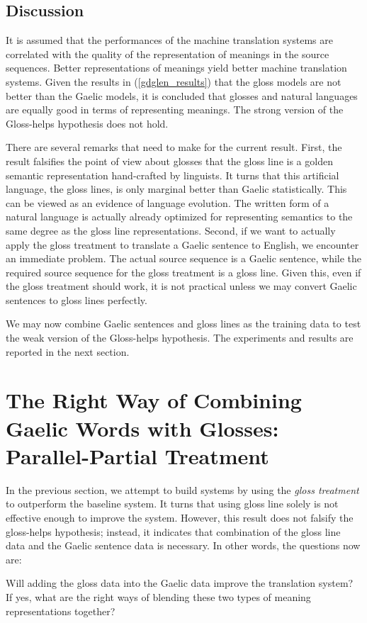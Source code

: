 \documentclass[11pt,a4paper]{article}
\begin{document}
\subsection{Discussion}
It is assumed that the performances of the machine translation systems are correlated with the quality of the representation of meanings in the source sequences. 
Better representations of meanings yield better machine translation systems. Given the results in (\ref{gdglen_results}) that the gloss models are not better than the Gaelic models, it is concluded that glosses and natural languages are equally good in terms of representing meanings. The strong version of the Gloss-helps hypothesis does not hold.

There are several remarks that need to make for the current result. First, the result falsifies the point of view about glosses that the gloss line is a golden semantic representation hand-crafted by linguists.
It turns that this artificial language, the gloss lines, is only marginal better than Gaelic statistically. This can be viewed as an evidence of language evolution.
The written form of a natural language is actually already optimized for representing semantics to the same degree as the gloss line representations.
Second, if we want to actually apply the gloss treatment to translate a Gaelic sentence to English, we encounter an immediate problem. The actual source sequence is a Gaelic sentence, while the required source sequence for the gloss treatment is a gloss line. Given this, even if the gloss treatment should work, it is not practical unless we may convert Gaelic sentences to gloss lines perfectly.      

We may now combine Gaelic sentences and gloss lines as the training data to test the weak version of the Gloss-helps hypothesis. The experiments and results are reported in the next section.
\section{The Right Way of Combining Gaelic Words with Glosses: Parallel-Partial Treatment}\label{gd_plus_gl_to_en}
In the previous section, we attempt to build systems by using the \textit{gloss treatment} to outperform the baseline system. It turns that using gloss line solely is not effective enough to improve the system. However, this result does not falsify the gloss-helps hypothesis; instead, it indicates that combination of the gloss line data and the Gaelic sentence data is necessary. In other words, the questions now are: 
\begin{exe}
	\ex 
	\begin{xlist}
		\ex Will adding the gloss data into the Gaelic data improve the translation system? 
		\ex If yes, what are the right ways of blending these two types of meaning representations together? 
	\end{xlist}	
\end{exe}
\end{document}
